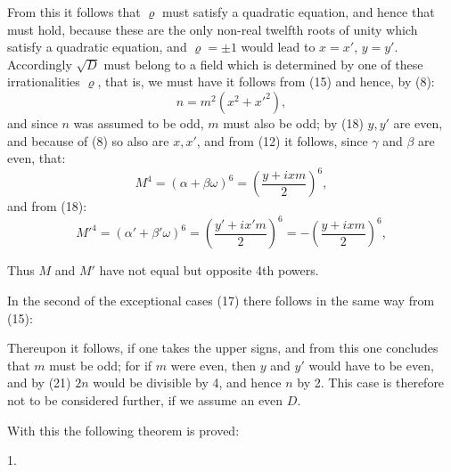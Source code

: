 
From this it follows that $\varrho$ must satisfy a quadratic equation, and hence that
must hold, because these are the only non-real twelfth roots of unity which satisfy a quadratic equation, and $\varrho=\pm1$ would lead to $x=x'$, $y=y'$. Accordingly $\sqrt D$ must belong to a field which is determined by one of these irrationalities $\varrho$, that is, we must have
 it follows from (15)
and hence, by (8):
\[
n=m^2(x^2+x'^2),
\]
and since $n$ was assumed to be odd, $m$ must also be odd; by (18) $y,y'$ are even, and because of (8) so also are $x,x'$, and from (12) it follows, since $\gamma$ and $\beta$ are even, that:
\[
M^4=(\alpha+\beta\omega)^6=\left(\dfrac{y+ixm}{2}\right)^6,
\]
and from (18):
\[
M'^4=(\alpha'+\beta'\omega)^6=\left(\dfrac{y'+ix'm}{2}\right)^6=-\left(\dfrac{y+ixm}{2}\right)^6,
\]

Thus $M$ and $M'$ have not equal but opposite 4th powers.

In the second of the exceptional cases (17) there follows in the same way from (15):

Thereupon it follows, if one takes the upper signs,
and from this one concludes that $m$ must be odd; for if $m$ were even, then $y$ and $y'$ would have to be even, and by (21) $2n$ would be divisible by 4, and hence $n$ by 2. This case is therefore not to be considered further, if we assume an even $D$.

With this the following theorem is proved:

1. 
